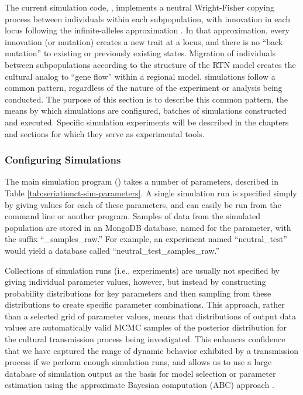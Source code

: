 The current simulation code, , implements a neutral Wright-Fisher copying process between individuals within each subpopulation, with innovation in each locus following the infinite-alleles approximation \citep{Kimura1968}.  In that approximation, every innovation (or mutation) creates a new trait at a locus, and there is no ``back mutation'' to existing or previously existing states.  Migration of individuals between subpopulations according to the structure of the RTN model creates the cultural analog to ``gene flow'' within a regional model.  \seriationct simulations  follow a common pattern, regardless of the nature of the experiment or analysis being conducted.  The purpose of this section is to describe this common pattern, the means by which simulations are configured, batches of simulations constructed and executed.  Specific simulation experiments will be described in the chapters and sections for which they serve as experimental tools.  


\subsubsection{Configuring \seriationct Simulations}



The main simulation program () takes a number of parameters, described in Table \ref{tab:seriationct-sim-parameters}.  A single simulation run is specified simply by giving values for each of these parameters, and can easily be run from the command line or another program.  Samples of data from the simulated population are stored in an MongoDB database, named for the  parameter, with the suffix ``\_samples\_raw.''  For example, an experiment named ``neutral\_test'' would yield a database called ``neutral\_test\_samples\_raw.''  

Collections of simulation runs (i.e., experiments) are usually not specified by giving individual parameter values, however, but instead by constructing probability distributions for key parameters and then sampling from these distributions to create specific parameter combinations.  This approach, rather than a selected grid of parameter values, means that distributions of output data values are automatically valid MCMC samples of the posterior distribution for the cultural transmission process being investigated.  This enhances confidence that we have captured the range of dynamic behavior exhibited by a transmission process if we perform enough simulation runs, and allows us to use a large database of simulation output as the basis for model selection or parameter estimation using the approximate Bayesian computation (ABC) approach \citep{Beaumont2002,Beaumont2010,Csillery2010,Marin2012,Sottoriva2010,Toni2009}.  

